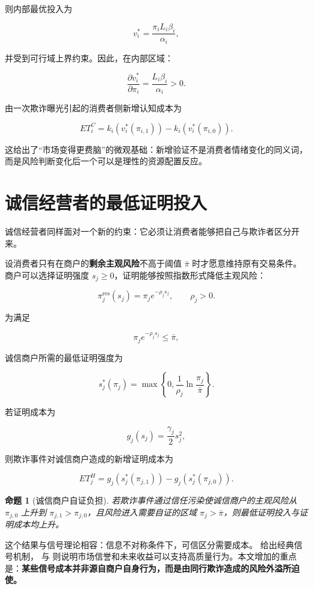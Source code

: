 \documentclass[UTF8,12pt]{ctexart}
\newtheorem{proposition}{命题}
\begin{document}
则内部最优投入为

\[
v_i^*=\frac{\pi_iL_i\beta_i}{\alpha_i},
\]

并受到可行域上界约束。因此，在内部区域：

\[
\frac{\partial v_i^*}{\partial \pi_i}
=\frac{L_i\beta_i}{\alpha_i}>0.
\]

由一次欺诈曝光引起的消费者侧新增认知成本为

\[
ET_i^C
=k_i(v_i^*(\pi_{i,1}))-k_i(v_i^*(\pi_{i,0})).
\]

这给出了“市场变得更费脑”的微观基础：新增验证不是消费者情绪变化的同义词，而是风险判断变化后一个可以是理性的资源配置反应。

\section{诚信经营者的最低证明投入}

诚信经营者同样面对一个新的约束：它必须让消费者能够把自己与欺诈者区分开来。

设消费者只有在商户的\textbf{剩余主观风险}不高于阈值 $\bar\pi$ 时才愿意维持原有交易条件。商户可以选择证明强度 $s_j\geq0$，证明能够按照指数形式降低主观风险：

\[
\pi_j^{\mathrm{res}}(s_j)=\pi_j e^{-\rho_j s_j},
\qquad \rho_j>0.
\]

为满足

\[
\pi_j e^{-\rho_js_j}\leq\bar\pi,
\]

诚信商户所需的最低证明强度为

\[
s_j^*(\pi_j)
=\max\left\{0,\frac{1}{\rho_j}\ln\frac{\pi_j}{\bar\pi}\right\}.
\]

若证明成本为

\[
g_j(s_j)=\frac{\gamma_j}{2}s_j^2,
\]

则欺诈事件对诚信商户造成的新增证明成本为

\[
ET_j^H
=g_j(s_j^*(\pi_{j,1}))-g_j(s_j^*(\pi_{j,0})).
\]

\begin{proposition}[诚信商户自证负担]
若欺诈事件通过信任污染使诚信商户的主观风险从 $\pi_{j,0}$ 上升到 $\pi_{j,1}>\pi_{j,0}$，且风险进入需要自证的区域 $\pi_j>\bar\pi$，则最低证明投入与证明成本均上升。
\end{proposition}

这个结果与信号理论相容：信息不对称条件下，可信区分需要成本。\citet{spence1973signaling} 给出经典信号机制，\citet{kleinleffler1981performance} 与 \citet{shapiro1983reputation} 则说明市场信誉和未来收益可以支持高质量行为。本文增加的重点是：\textbf{某些信号成本并非源自商户自身行为，而是由同行欺诈造成的风险外溢所迫使。}
\end{document}
